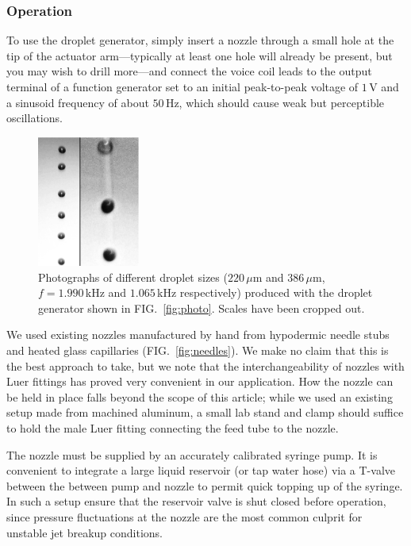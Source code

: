 \documentclass[11.5pt]{book}
\begin{document}
\subsubsection{Operation}
To use the droplet generator, simply insert a nozzle through a small hole at the
tip of the actuator arm---typically at least one hole will already be present, but you may wish to drill
more---and connect the voice coil leads to the output terminal of a function
generator set to an initial peak-to-peak voltage of $1\,$V and a sinusoid frequency of
about $50\,$Hz, which should cause weak but perceptible oscillations.

\begin{figure}
\centering
\includegraphics[width=0.3\textwidth]{papers/hdg_images/photo.eps}
\caption{Photographs of different droplet sizes ($220\,\mu$m and $386\,\mu$m,
    $f=1.990\,$kHz and $1.065\,$kHz respectively) produced with the droplet
generator shown in FIG.~\ref{fig:photo}. Scales have been cropped out. \label{fig:dropphoto}}
\end{figure}
We used existing nozzles manufactured by hand from hypodermic needle stubs and
heated glass capillaries (FIG.~\ref{fig:needles}). We make no claim that this is
the best approach to take, but we note that the interchangeability of nozzles
with Luer fittings has proved very convenient in our application. How the nozzle
can be held in place falls beyond the scope of this article; while we used an
existing setup made from machined aluminum, a small lab stand and clamp should
suffice to hold the male Luer fitting connecting the feed tube to the nozzle.

The nozzle must be supplied by an accurately calibrated syringe pump. It is
convenient to integrate a large liquid reservoir (or tap water hose) via a
T-valve between the between pump and nozzle to permit quick topping up of the
syringe. In such a setup ensure that the reservoir valve is shut closed before operation,
since pressure fluctuations at the nozzle are the most common culprit for
unstable jet breakup conditions.
\end{document}
